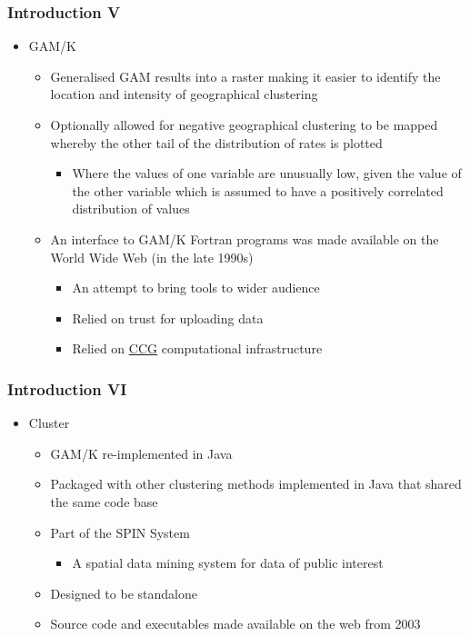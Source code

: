 \documentclass{beamer}
\begin{document}
\begin{frame}[t]
\frametitle{Introduction V}
\begin{itemize}
  \item GAM/K
  \begin{itemize}
    \item Generalised GAM results into a raster making it easier to identify the location and intensity of geographical clustering
    \item Optionally allowed for negative geographical clustering to be mapped whereby the other tail of the distribution of rates is plotted
    \begin{itemize}
      \item Where the values of one variable are unusually low, given the value of the other variable which is assumed to have a positively correlated distribution of values
    \end{itemize}
    \item An interface to GAM/K Fortran programs was made available on the World Wide Web (in the late 1990s)
    \begin{itemize}
      \item An attempt to bring tools to wider audience
      \item Relied on trust for uploading data
      \item Relied on \href{http://www.ccg.leeds.ac.uk/}{CCG} computational infrastructure
    \end{itemize}
  \end{itemize}
\end{itemize}
\end{frame}

\begin{frame}[t]
\frametitle{Introduction VI}
\begin{itemize}
  \item Cluster
  \begin{itemize}
    \item GAM/K re-implemented in Java
    \item Packaged with other clustering methods implemented in Java that shared the same code base
    \item Part of the SPIN System
    \begin{itemize}
      \item A spatial data mining system for data of public interest
    \end{itemize}
    \item Designed to be standalone
    \item Source code and executables made available on the web from 2003
  \end{itemize}
\end{itemize}
\end{frame}
\end{document}

